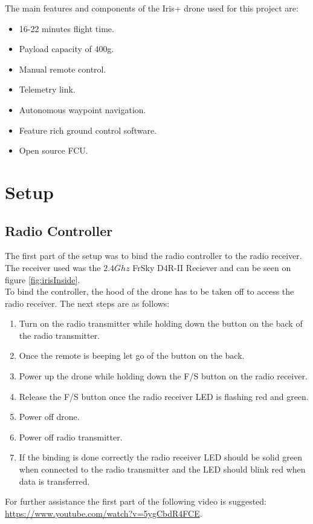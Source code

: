 \newpage

The main features and components of the Iris+ drone used for this project are:
\begin{itemize}
\item 16-22 minutes flight time.
\item Payload capacity of 400g.
\item Manual remote control.
\item Telemetry link.
\item Autonomous waypoint navigation.
\item Feature rich ground control software.
\item Open source FCU. %
\end{itemize}



\section{Setup}
\label{sec:setup}
\subsection*{Radio Controller}
The first part of the setup was to bind the radio controller to the radio receiver. The receiver
used was the $2.4 Ghz$ FrSky D4R-II Reciever \cite{Ref:FrSky} and can be seen on figure
\ref{fig:irisInside}.
\\
To bind the controller, the hood of the drone has to be taken off to access the radio receiver.
The next steps are as follows:
\begin{enumerate}
\item Turn on the radio transmitter while holding down the button on the back of the radio transmitter.
\item Once the remote is beeping let go of the button on the back.
\item Power up the drone while holding down the F/S button on the radio receiver.
\item Release the F/S button once the radio receiver LED is flashing red and green.
\item Power off drone.
\item Power off radio transmitter.
\item If the binding is done correctly the radio receiver LED should be solid green when connected
to the radio transmitter and the LED should blink red when data is transferred.
\end{enumerate}
For further assistance the first part of the following video is suggested:
\url{https://www.youtube.com/watch?v=5ygCbdR4FCE}.

